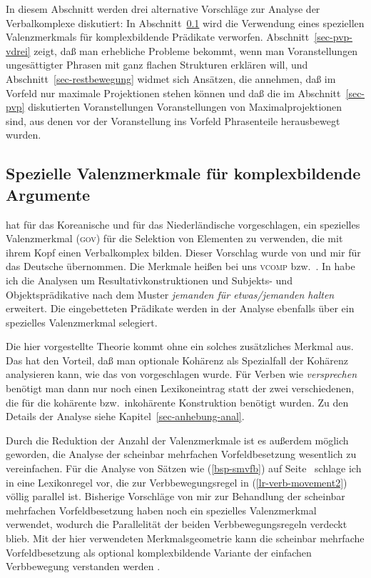 In diesem Abschnitt werden drei alternative Vorschläge zur Analyse der Verbalkomplexe diskutiert:
In Abschnitt~\ref{sec-vcomp} wird die Verwendung eines speziellen Valenzmerkmals für komplexbildende
Prädikate verworfen. Abschnitt~\ref{sec-pvp-vdrei} zeigt, daß man erhebliche Probleme bekommt,
wenn man Voranstellungen ungesättigter Phrasen mit ganz flachen Strukturen erklären will,
und Abschnitt~\ref{sec-restbewegung} widmet sich Ansätzen, die annehmen, daß im Vorfeld nur maximale
Projektionen stehen können und daß die im Abschnitt~\ref{sec-pvp} diskutierten Voranstellungen
Voranstellungen von Maximalprojektionen sind, aus denen vor der Voranstellung ins Vorfeld
Phrasenteile herausbewegt wurden.

\subsection{Spezielle Valenzmerkmale für komplexbildende Argumente}
\label{sec-vcomp}

\citet*{Chung93a} hat für das Koreanische
und \citet*{Rentier94} für das Niederländische vorgeschlagen,
ein spezielles Valenzmerkmal (\textsc{gov}) für die Selektion von Elementen zu verwenden,
die mit ihrem Kopf einen Verbalkomplex bilden. Dieser Vorschlag wurde
von \citet{Kathol98b,Kathol2000a} und mir \citep{Mueller97c,Mueller99a} für das Deutsche übernommen.
Die Merkmale heißen bei uns \textsc{vcomp} bzw.\ \xcomp.
In  habe ich die Analysen um Resultativkonstruktionen und Subjekts- und
Objektsprädikative nach dem Muster \emph{jemanden für etwas/jemanden halten} erweitert.
Die eingebetteten Prädikate werden in der Analyse ebenfalls über ein spezielles Valenzmerkmal selegiert.

Die hier vorgestellte Theorie kommt ohne ein solches zusätzliches Merkmal aus.
Das hat den Vorteil, daß man optionale Kohärenz als Spezialfall der Kohärenz analysieren
kann, wie das von \citet{Kiss95a} vorgeschlagen wurde. Für Verben wie \emph{versprechen}
benötigt man dann nur noch einen Lexikoneintrag statt der zwei verschiedenen, die für
die kohärente bzw.\ inkohärente Konstruktion benötigt wurden. Zu den Details der Analyse siehe
Kapitel~\ref{sec-anhebung-anal}.

Durch die Reduktion der Anzahl der Valenzmerkmale ist es außerdem möglich geworden,
die Analyse der scheinbar mehrfachen Vorfeldbesetzung wesentlich zu vereinfachen.
Für die Analyse von Sätzen wie (\ref{bsp-smvfb}) auf Seite~\pageref{bsp-smvfb} schlage ich in 
eine Lexikonregel vor, die zur Verbbewegungsregel in (\ref{lr-verb-movement2})
völlig parallel ist. Bisherige Vorschläge von mir zur Behandlung der 
scheinbar mehrfachen Vorfeldbesetzung \citep{Mueller2002f,Mueller2002c} haben
noch ein spezielles Valenzmerkmal verwendet, wodurch die Parallelität der beiden
Verbbewegungsregeln verdeckt blieb. Mit der hier verwendeten Merkmalsgeometrie kann
die scheinbar mehrfache Vorfeldbesetzung als optional komplexbildende Variante
der einfachen Verbbewegung verstanden werden \citep{Mueller2005d}.



